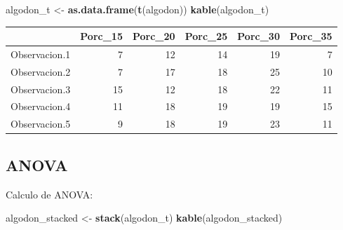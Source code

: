 \documentclass[]{article}
\newenvironment{Shaded}{\begin{snugshade}}{\end{snugshade}}
\newcommand{\KeywordTok}[1]{\textcolor[rgb]{0.13,0.29,0.53}{\textbf{#1}}}
\newcommand{\StringTok}[1]{\textcolor[rgb]{0.31,0.60,0.02}{#1}}
\newcommand{\NormalTok}[1]{#1}
\begin{document}
\begin{Shaded}
\begin{Highlighting}[]
\NormalTok{algodon_t <-}\StringTok{ }\KeywordTok{as.data.frame}\NormalTok{(}\KeywordTok{t}\NormalTok{(algodon))}
\KeywordTok{kable}\NormalTok{(algodon_t)}
\end{Highlighting}
\end{Shaded}

\begin{tabular}{l|r|r|r|r|r}
\hline
  & Porc\_15 & Porc\_20 & Porc\_25 & Porc\_30 & Porc\_35\\
\hline
Observacion.1 & 7 & 12 & 14 & 19 & 7\\
\hline
Observacion.2 & 7 & 17 & 18 & 25 & 10\\
\hline
Observacion.3 & 15 & 12 & 18 & 22 & 11\\
\hline
Observacion.4 & 11 & 18 & 19 & 19 & 15\\
\hline
Observacion.5 & 9 & 18 & 19 & 23 & 11\\
\hline
\end{tabular}

\subsection{ANOVA}\label{anova}

Calculo de ANOVA:

\begin{Shaded}
\begin{Highlighting}[]
\NormalTok{algodon_stacked <-}\StringTok{ }\KeywordTok{stack}\NormalTok{(algodon_t)}
\KeywordTok{kable}\NormalTok{(algodon_stacked)}
\end{Highlighting}
\end{Shaded}
\end{document}
